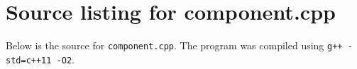 \documentclass[12pt,a4paper,hidelinks]{article}
\begin{document}
\appendix

\section{Source listing for component.cpp}
\label{appendix:components}

Below is the source for \texttt{component.cpp}. The program was compiled using \texttt{g++ -std=c++11 -O2}.


\end{document}

